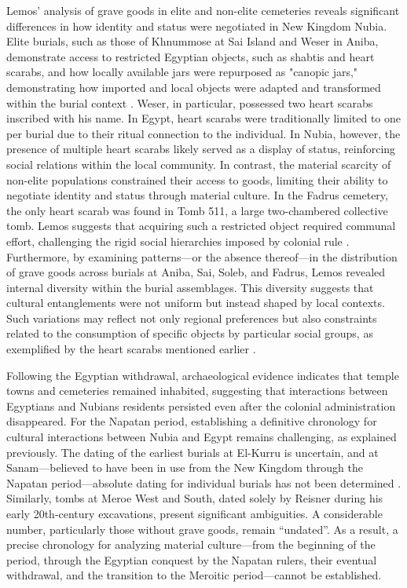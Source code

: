 Lemos’ analysis of grave goods in elite and non-elite cemeteries reveals significant differences in how identity and status were negotiated in New Kingdom Nubia. Elite burials, such as those of Khnummose at Sai Island and Weser in Aniba, demonstrate access to restricted Egyptian objects, such as shabtis and heart scarabs, and how locally available jars were repurposed as "canopic jars," demonstrating how imported and local objects were adapted and transformed within the burial context \parencites[p.~7]{lemosAlternativesColonizationMarginal2021}[p.~76-77]{lemosCulturalEntanglementsExperiencing2024}. Weser, in particular, possessed two heart scarabs inscribed with his name. In Egypt, heart scarabs were traditionally limited to one per burial due to their ritual connection to the individual. In Nubia, however, the presence of multiple heart scarabs likely served as a display of status, reinforcing social relations within the local community. In contrast, the material scarcity of non-elite populations constrained their access to goods, limiting their ability to negotiate identity and status through material culture. In the Fadrus cemetery, the only heart scarab was found in Tomb 511, a large two-chambered collective tomb. Lemos suggests that acquiring such a restricted object required communal effort, challenging the rigid social hierarchies imposed by colonial rule \parencites{lemosHeartScarabsOther2021, lemosCulturalEntanglementsExperiencing2024}. Furthermore, by examining patterns—or the absence thereof—in the distribution of grave goods across burials at Aniba, Sai, Soleb, and Fadrus, Lemos revealed  internal diversity within the burial assemblages. This diversity suggests that cultural entanglements were not uniform but instead shaped by local contexts. Such variations may reflect not only regional preferences but also constraints related to the consumption of specific objects by particular social groups, as exemplified by the heart scarabs mentioned earlier \parencite{lemosForeignObjectsLocal2020}.

Following the Egyptian withdrawal, archaeological evidence indicates that temple towns and cemeteries remained inhabited, suggesting that interactions between Egyptians and Nubians residents persisted even after the colonial administration disappeared. For the Napatan period, establishing a definitive chronology for cultural interactions between Nubia and Egypt remains challenging, as explained previously. The dating of the earliest burials at El-Kurru is uncertain, and at Sanam—believed to have been in use from the New Kingdom through the Napatan period—absolute dating for individual burials has not been determined \parencite{lohwasserAspekteNapatanischenGesellschaft2012}. Similarly, tombs at Meroe West and South, dated solely by Reisner during his early 20th-century excavations, present significant ambiguities. A considerable number, particularly those without grave goods, remain “undated”. As a result, a precise chronology for analyzing material culture—from the beginning of the period, through the Egyptian conquest by the Napatan rulers, their eventual withdrawal, and the transition to the Meroitic period—cannot be established.

